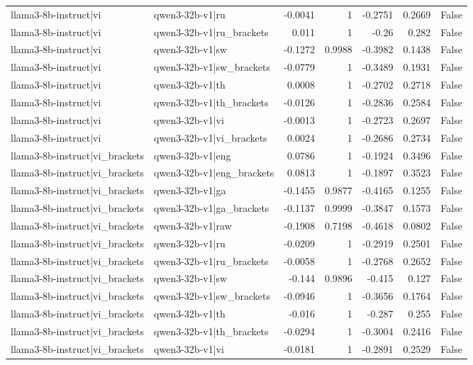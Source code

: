 \begin{table}
\begin{tabular}{l l r r r r l}
llama3-8b-instruct|vi & qwen3-32b-v1|ru & -0.0041 & 1 & -0.2751 & 0.2669 & False \\
llama3-8b-instruct|vi & qwen3-32b-v1|ru_brackets & 0.011 & 1 & -0.26 & 0.282 & False \\
llama3-8b-instruct|vi & qwen3-32b-v1|sw & -0.1272 & 0.9988 & -0.3982 & 0.1438 & False \\
llama3-8b-instruct|vi & qwen3-32b-v1|sw_brackets & -0.0779 & 1 & -0.3489 & 0.1931 & False \\
llama3-8b-instruct|vi & qwen3-32b-v1|th & 0.0008 & 1 & -0.2702 & 0.2718 & False \\
llama3-8b-instruct|vi & qwen3-32b-v1|th_brackets & -0.0126 & 1 & -0.2836 & 0.2584 & False \\
llama3-8b-instruct|vi & qwen3-32b-v1|vi & -0.0013 & 1 & -0.2723 & 0.2697 & False \\
llama3-8b-instruct|vi & qwen3-32b-v1|vi_brackets & 0.0024 & 1 & -0.2686 & 0.2734 & False \\
llama3-8b-instruct|vi_brackets & qwen3-32b-v1|eng & 0.0786 & 1 & -0.1924 & 0.3496 & False \\
llama3-8b-instruct|vi_brackets & qwen3-32b-v1|eng_brackets & 0.0813 & 1 & -0.1897 & 0.3523 & False \\
llama3-8b-instruct|vi_brackets & qwen3-32b-v1|ga & -0.1455 & 0.9877 & -0.4165 & 0.1255 & False \\
llama3-8b-instruct|vi_brackets & qwen3-32b-v1|ga_brackets & -0.1137 & 0.9999 & -0.3847 & 0.1573 & False \\
llama3-8b-instruct|vi_brackets & qwen3-32b-v1|raw & -0.1908 & 0.7198 & -0.4618 & 0.0802 & False \\
llama3-8b-instruct|vi_brackets & qwen3-32b-v1|ru & -0.0209 & 1 & -0.2919 & 0.2501 & False \\
llama3-8b-instruct|vi_brackets & qwen3-32b-v1|ru_brackets & -0.0058 & 1 & -0.2768 & 0.2652 & False \\
llama3-8b-instruct|vi_brackets & qwen3-32b-v1|sw & -0.144 & 0.9896 & -0.415 & 0.127 & False \\
llama3-8b-instruct|vi_brackets & qwen3-32b-v1|sw_brackets & -0.0946 & 1 & -0.3656 & 0.1764 & False \\
llama3-8b-instruct|vi_brackets & qwen3-32b-v1|th & -0.016 & 1 & -0.287 & 0.255 & False \\
llama3-8b-instruct|vi_brackets & qwen3-32b-v1|th_brackets & -0.0294 & 1 & -0.3004 & 0.2416 & False \\
llama3-8b-instruct|vi_brackets & qwen3-32b-v1|vi & -0.0181 & 1 & -0.2891 & 0.2529 & False \\

\end{tabular}
\end{table}
